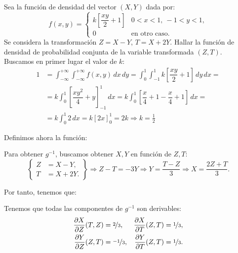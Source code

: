 \begin{ejercicio}
    Sea la función de densidad del vector $(X,Y)$ dada por:
    \begin{equation*}
        f(x, y) = \begin{cases}
            k\left[\dfrac{xy}{2}+1\right] & 0<x<1,~-1<y<1, \\
            0 & \text{en otro caso}.
        \end{cases}
    \end{equation*}
    Se considera la transformación $Z=X-Y$, $T=X+2Y$. Hallar la función de densidad de probabilidad conjunta de la variable transformada $(Z,T)$.\\

    Buscamos en primer lugar el valor de $k$:
    \begin{align*}
        1&=\int_{-\infty}^{+\infty} \int_{-\infty}^{+\infty} f(x, y) \, dx \, dy = \int_{0}^{1} \int_{-1}^{1} k\left[\dfrac{xy}{2}+1\right] \, dy \, dx
        =\\&= k\int_{0}^{1} \left[\dfrac{xy^2}{4}+y\right]_{-1}^{1} \, dx = k\int_{0}^{1} \left[\dfrac{x}{4}+1-\dfrac{x}{4}+1\right] \, dx
        =\\&= k\int_{0}^{1} 2 \, dx = k\left[2x\right]_0^1 = 2k \Longrightarrow k=\frac{1}{2}
    \end{align*}

    Definimos ahora la función:

    Para obtener $g^{-1}$, buscamos obtener $X,Y$ en función de $Z,T$:
    \begin{equation*}
        \left\{\begin{aligned}
            Z&=X-Y, \\
            T&=X+2Y.
        \end{aligned}\right\}\Longrightarrow
        Z-T=-3Y\Longrightarrow Y=\dfrac{T-Z}{3}\Longrightarrow X=\dfrac{2Z+T}{3}.
    \end{equation*}

    Por tanto, tenemos que:

    Tenemos que todas las componentes de $g^{-1}$ son derivables:
    \begin{align*}
        \dfrac{\partial X}{\partial Z}(T,Z)&=\nicefrac{2}{3}, & \dfrac{\partial X}{\partial T}(Z,T)&=\nicefrac{1}{3},\\
        \dfrac{\partial Y}{\partial Z}(Z,T)&=\nicefrac{-1}{3}, & \dfrac{\partial Y}{\partial T}(Z,T)&=\nicefrac{1}{3}.
    \end{align*}


\end{ejercicio}
